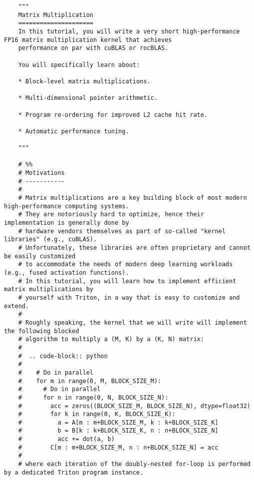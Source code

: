 \documentclass{article}
\begin{document}
\begin{lstlisting}
    """
    Matrix Multiplication
    =====================
    In this tutorial, you will write a very short high-performance FP16 matrix multiplication kernel that achieves
    performance on par with cuBLAS or rocBLAS.

    You will specifically learn about:

    * Block-level matrix multiplications.

    * Multi-dimensional pointer arithmetic.

    * Program re-ordering for improved L2 cache hit rate.

    * Automatic performance tuning.

    """

    # %%
    # Motivations
    # -----------
    #
    # Matrix multiplications are a key building block of most modern high-performance computing systems.
    # They are notoriously hard to optimize, hence their implementation is generally done by
    # hardware vendors themselves as part of so-called "kernel libraries" (e.g., cuBLAS).
    # Unfortunately, these libraries are often proprietary and cannot be easily customized
    # to accommodate the needs of modern deep learning workloads (e.g., fused activation functions).
    # In this tutorial, you will learn how to implement efficient matrix multiplications by
    # yourself with Triton, in a way that is easy to customize and extend.
    #
    # Roughly speaking, the kernel that we will write will implement the following blocked
    # algorithm to multiply a (M, K) by a (K, N) matrix:
    #
    #  .. code-block:: python
    #
    #    # Do in parallel
    #    for m in range(0, M, BLOCK_SIZE_M):
    #      # Do in parallel
    #      for n in range(0, N, BLOCK_SIZE_N):
    #        acc = zeros((BLOCK_SIZE_M, BLOCK_SIZE_N), dtype=float32)
    #        for k in range(0, K, BLOCK_SIZE_K):
    #          a = A[m : m+BLOCK_SIZE_M, k : k+BLOCK_SIZE_K]
    #          b = B[k : k+BLOCK_SIZE_K, n : n+BLOCK_SIZE_N]
    #          acc += dot(a, b)
    #        C[m : m+BLOCK_SIZE_M, n : n+BLOCK_SIZE_N] = acc
    #
    # where each iteration of the doubly-nested for-loop is performed by a dedicated Triton program instance.


\end{lstlisting}
\end{document}
